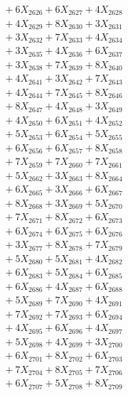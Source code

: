 \documentclass[a4paper,10pt]{article}
\begin{document}
{\begin{align}
&\;  + 6 X_{2626} + 6 X_{2627} + 4 X_{2628} \\[0.3ex]
&\;  + 4 X_{2629} + 8 X_{2630} + 3 X_{2631} \\[0.3ex]
&\;  + 3 X_{2632} + 7 X_{2633} + 4 X_{2634} \\[0.3ex]
&\;  + 3 X_{2635} + 4 X_{2636} + 6 X_{2637} \\[0.3ex]
&\;  + 3 X_{2638} + 7 X_{2639} + 8 X_{2640} \\[0.3ex]
&\;  + 4 X_{2641} + 3 X_{2642} + 7 X_{2643} \\[0.3ex]
&\;  + 4 X_{2644} + 7 X_{2645} + 8 X_{2646} \\[0.3ex]
&\;  + 8 X_{2647} + 4 X_{2648} + 3 X_{2649} \\[0.5ex]\allowbreak
&\;  + 4 X_{2650} + 6 X_{2651} + 4 X_{2652} \\[0.3ex]
&\;  + 5 X_{2653} + 6 X_{2654} + 5 X_{2655} \\[0.3ex]
&\;  + 6 X_{2656} + 6 X_{2657} + 8 X_{2658} \\[0.3ex]
&\;  + 7 X_{2659} + 7 X_{2660} + 7 X_{2661} \\[0.3ex]
&\;  + 5 X_{2662} + 3 X_{2663} + 8 X_{2664} \\[0.3ex]
&\;  + 6 X_{2665} + 3 X_{2666} + 6 X_{2667} \\[0.3ex]
&\;  + 8 X_{2668} + 3 X_{2669} + 5 X_{2670} \\[0.3ex]
&\;  + 7 X_{2671} + 8 X_{2672} + 6 X_{2673} \\[0.3ex]
&\;  + 6 X_{2674} + 6 X_{2675} + 6 X_{2676} \\[0.3ex]
&\;  + 3 X_{2677} + 8 X_{2678} + 7 X_{2679} \\[0.5ex]\allowbreak
&\;  + 5 X_{2680} + 5 X_{2681} + 4 X_{2682} \\[0.3ex]
&\;  + 6 X_{2683} + 5 X_{2684} + 6 X_{2685} \\[0.3ex]
&\;  + 6 X_{2686} + 4 X_{2687} + 6 X_{2688} \\[0.3ex]
&\;  + 5 X_{2689} + 7 X_{2690} + 4 X_{2691} \\[0.3ex]
&\;  + 7 X_{2692} + 7 X_{2693} + 6 X_{2694} \\[0.3ex]
&\;  + 4 X_{2695} + 6 X_{2696} + 4 X_{2697} \\[0.3ex]
&\;  + 5 X_{2698} + 4 X_{2699} + 3 X_{2700} \\[0.3ex]
&\;  + 6 X_{2701} + 8 X_{2702} + 6 X_{2703} \\[0.3ex]
&\;  + 7 X_{2704} + 8 X_{2705} + 7 X_{2706} \\[0.3ex]
&\;  + 6 X_{2707} + 5 X_{2708} + 8 X_{2709} \\[0.5ex]\allowbreak

\end{align}}
\end{document}
